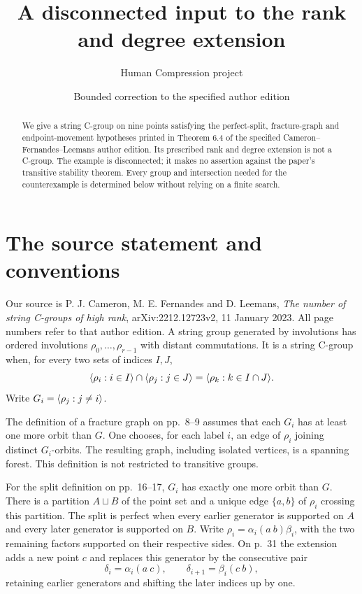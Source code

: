 \documentclass[11pt,a4paper]{article}
\title{A disconnected input to the rank and degree extension}
\author{Human Compression project}
\date{Bounded correction to the specified author edition}
\begin{document}
\maketitle
\begin{abstract}
We give a string C-group on nine points satisfying the perfect-split,
fracture-graph and endpoint-movement hypotheses printed in Theorem 6.4 of
the specified Cameron--Fernandes--Leemans author edition. Its prescribed
rank and degree extension is not a C-group. The example is disconnected;
it makes no assertion against the paper's transitive stability theorem.
Every group and intersection needed for the counterexample is determined
below without relying on a finite search.
\end{abstract}

\section{The source statement and conventions}
Our source is P. J. Cameron, M. E. Fernandes and D. Leemans,
\emph{The number of string C-groups of high rank},
arXiv:2212.12723v2, 11 January 2023. All page numbers refer to that
author edition. A string group generated by involutions has ordered
involutions $\rho_0,\ldots,\rho_{r-1}$ with distant commutations.
It is a string C-group when, for every two sets of indices $I,J$,
\[
 \langle\rho_i:i\in I\rangle\cap\langle\rho_j:j\in J\rangle
       =\langle\rho_k:k\in I\cap J\rangle.
\]
Write $G_i=\langle\rho_j:j\ne i\rangle$.

The definition of a fracture graph on pp.~8--9 assumes that each $G_i$
has at least one more orbit than $G$. One chooses, for each label $i$,
an edge of $\rho_i$ joining distinct $G_i$-orbits. The resulting graph,
including isolated vertices, is a spanning forest. This definition is not
restricted to transitive groups.

For the split definition on pp.~16--17, $G_i$ has exactly one more orbit
than $G$. There is a partition $A\sqcup B$ of the point set and a unique
edge $\{a,b\}$ of $\rho_i$ crossing this partition. The split is perfect
when every earlier generator is supported on $A$ and every later generator
is supported on $B$. Write
$\rho_i=\alpha_i(a\ b)\beta_i$, with the two remaining factors supported
on their respective sides. On p.~31 the extension adds a new point $c$
and replaces this generator by the consecutive pair
\[
 \delta_i=\alpha_i(a\ c),\qquad
 \delta_{i+1}=\beta_i(c\ b),
\]
retaining earlier generators and shifting the later indices up by one.
\end{document}
